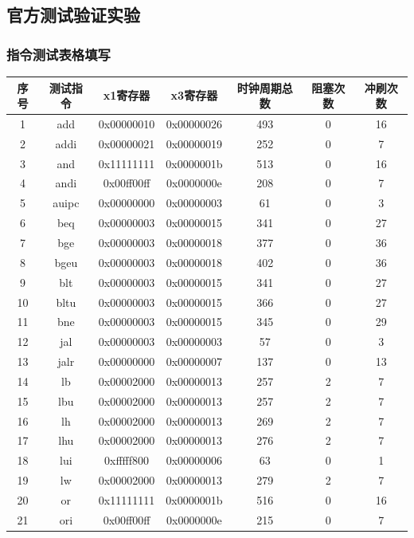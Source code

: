 \documentclass[UTF8,a4paper,11pt]{ctexart}
\newcommand{\placeholder}[1]{
\begin{tcolorbox}[colback=sub,colframe=main,boxrule=0.6pt,arc=2mm,left=2mm,right=2mm,top=1mm,bottom=1mm]
#1
\end{tcolorbox}
}
\begin{document}
\subsection{官方测试验证实验}

\subsubsection{指令测试表格填写}
\placeholder{
\begin{center}
\small
\begin{tabular}{ccccccc}
\toprule
序号 & 测试指令 & x1寄存器 & x3寄存器 & 时钟周期总数 & 阻塞次数 & 冲刷次数 \\
\midrule
1 & add & 0x00000010 & 0x00000026 & 493 & 0 & 16 \\
2 & addi & 0x00000021 & 0x00000019 & 252 & 0 & 7 \\
3 & and & 0x11111111 & 0x0000001b & 513 & 0 & 16 \\
4 & andi & 0x00ff00ff & 0x0000000e & 208 & 0 & 7 \\
5 & auipc & 0x00000000 & 0x00000003 & 61 & 0 & 3 \\
6 & beq & 0x00000003 & 0x00000015 & 341 & 0 & 27 \\
7 & bge & 0x00000003 & 0x00000018 & 377 & 0 & 36 \\
8 & bgeu & 0x00000003 & 0x00000018 & 402 & 0 & 36 \\
9 & blt & 0x00000003 & 0x00000015 & 341 & 0 & 27 \\
10 & bltu & 0x00000003 & 0x00000015 & 366 & 0 & 27 \\
11 & bne & 0x00000003 & 0x00000015 & 345 & 0 & 29 \\
12 & jal & 0x00000003 & 0x00000003 & 57 & 0 & 3 \\
13 & jalr & 0x00000000 & 0x00000007 & 137 & 0 & 13 \\
14 & lb & 0x00002000 & 0x00000013 & 257 & 2 & 7 \\
15 & lbu & 0x00002000 & 0x00000013 & 257 & 2 & 7 \\
16 & lh & 0x00002000 & 0x00000013 & 269 & 2 & 7 \\
17 & lhu & 0x00002000 & 0x00000013 & 276 & 2 & 7 \\
18 & lui & 0xfffff800 & 0x00000006 & 63 & 0 & 1 \\
19 & lw & 0x00002000 & 0x00000013 & 279 & 2 & 7 \\
20 & or & 0x11111111 & 0x0000001b & 516 & 0 & 16 \\
21 & ori & 0x00ff00ff & 0x0000000e & 215 & 0 & 7 \\

\end{tabular}
\end{center}}
\end{document}
